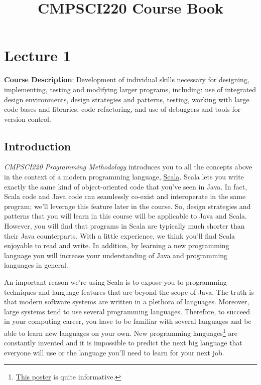 \documentclass{book}
\title{CMPSCI220 Course Book}
\begin{document}
\maketitle
\tableofcontents

\chapter{Lecture 1}

\textbf{Course Description}: Development of individual skills necessary for
designing, implementing, testing and modifying larger programs, including: use
of integrated design environments, design strategies and patterns, testing,
working with large code bases and libraries, code refactoring, and use of
debuggers and tools for version control.


\section{Introduction}

\emph{CMPSCI220 Programming Methodology} introduces you to all the concepts
above in the context of a modern programming language,
\href{http://www.scala-lang.org/what-is-scala.html}{Scala}.
Scala lets you write exactly the same kind
of object-oriented code that you've seen in Java. In fact, Scala code and Java
code can seamlessly co-exist and interoperate in the same program; we'll
leverage this feature later in the course. So, design strategies and patterns
that you will learn in this course will be applicable to Java and Scala.
However, you will find that programs in Scala are typically much shorter than
their Java counterparts. With a little experience, we think you'll find Scala
enjoyable to read and write. In addition, by learning a new programming language
you will increase your understanding of Java and programming languages in
general.

An important reason we're using Scala is to expose you to programming techniques
and language features that are beyond the scope of Java. The truth is that
modern software systems are written in a plethora of languages. Moreover, large
systems tend to use several programming languages. Therefore, to succeed in your
computing career, you have to be familiar with several languages and be able to
learn new languages on your own. New programming
languages\footnote{\href{http://www.oreillynet.com/pub/a/oreilly/news/languageposter_0504.html}{This poster} is quite informative.} are constantly
invented and it is impossible to predict the next big language that everyone
will use or the language you'll need to learn for your next job.
\end{document}
